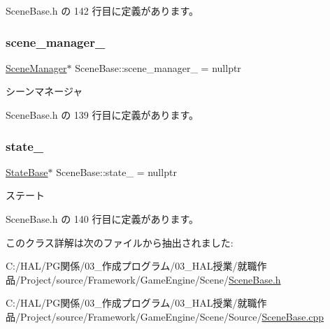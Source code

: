  Scene\+Base.\+h の 142 行目に定義があります。

\mbox{\label{class_scene_base_af9f693449ce2472d28f692bd64d5c2ef}} 
\subsubsection{\texorpdfstring{scene\+\_\+manager\+\_\+}{scene\_manager\_}}
{\footnotesize\ttfamily \mbox{\hyperlink{class_scene_manager}{Scene\+Manager}}$\ast$ Scene\+Base\+::scene\+\_\+manager\+\_\+ = nullptr\hspace{0.3cm}{\ttfamily [private]}}



シーンマネージャ 



 Scene\+Base.\+h の 139 行目に定義があります。

\mbox{\label{class_scene_base_a9d8b7237f492e9ce0724714393b0e881}} 
\subsubsection{\texorpdfstring{state\+\_\+}{state\_}}
{\footnotesize\ttfamily \mbox{\hyperlink{class_scene_base_1_1_state_base}{State\+Base}}$\ast$ Scene\+Base\+::state\+\_\+ = nullptr\hspace{0.3cm}{\ttfamily [private]}}



ステート 



 Scene\+Base.\+h の 140 行目に定義があります。



このクラス詳解は次のファイルから抽出されました\+:\begin{DoxyCompactItemize}
\item 
C\+:/\+H\+A\+L/\+P\+G関係/03\+\_\+作成プログラム/03\+\_\+\+H\+A\+L授業/就職作品/\+Project/source/\+Framework/\+Game\+Engine/\+Scene/\mbox{\hyperlink{_scene_base_8h}{Scene\+Base.\+h}}\item 
C\+:/\+H\+A\+L/\+P\+G関係/03\+\_\+作成プログラム/03\+\_\+\+H\+A\+L授業/就職作品/\+Project/source/\+Framework/\+Game\+Engine/\+Scene/\+Source/\mbox{\hyperlink{_scene_base_8cpp}{Scene\+Base.\+cpp}}\end{DoxyCompactItemize}
